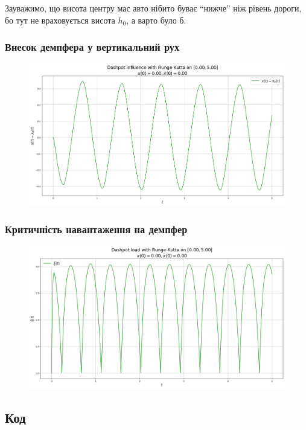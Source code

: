 Зауважимо, що висота центру мас авто нібито буває ``нижче'' ніж рівень дороги, бо тут не враховується висота $h_0$, а варто було б.

\subsubsection{Внесок демпфера у вертикальний рух}
\begin{figure}[H]
	\centering
	\includegraphics[width=\textwidth]{3.png}
\end{figure}

\subsubsection{Критичність навантаження на демпфер}
\begin{figure}[H]
	\centering
	\includegraphics[width=\textwidth]{4.png}
\end{figure}

\subsection{Код}


